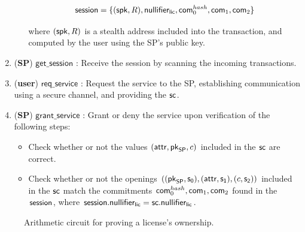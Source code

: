 \begin{enumerate}
\begin{itemize}
			$$\mathsf{session} = \{(\mathsf{spk}, R), \mathsf{nullifier_{lic}}, \mathsf{com}_0^{hash}, \mathsf{com}_1, \mathsf{com}_2\}$$

		where $(\mathsf{spk}, R)$ is a stealth address included into the transaction, and computed by the user using the SP's public key.


	\end{itemize}

	\item (\textbf{SP}) $\mathsf{get\_session}$ : Receive the session by scanning the incoming transactions.

	\item (\textbf{user}) $\mathsf{req\_service}$ : Request the service to the SP, establishing communication using a secure channel, and providing the $\mathsf{sc}$.

	\item (\textbf{SP}) $\mathsf{grant\_service}$ : Grant or deny the service upon verification of the following steps:

	\begin{itemize}
		\item Check whether or not the values $(\mathsf{attr}, \mathsf{pk}_{\mathsf{SP}}, c)$ included in the $\mathsf{sc}$ are correct.
		\item Check whether or not the openings $((\mathsf{pk}_{\mathsf{SP}}, \mathsf{s_0}), (\mathsf{attr}, \mathsf{s_1}), (c, \mathsf{s_2}))$ included in the $\mathsf{sc}$ match the commitments $\mathsf{com}_0^{hash}, \mathsf{com}_1, \mathsf{com}_2$ found in the $\mathsf{session}$, where $\mathsf{session}.\mathsf{nullifier_{lic}} = \mathsf{sc}.\mathsf{nullifier_{lic}}$.
	\end{itemize}

\end{enumerate}

\begin{figure}[h]
	\centering
	\setlength{\fboxsep}{5pt}%
	\setlength{\fboxrule}{0.3pt}%
	\caption{Arithmetic circuit for proving a license's ownership.}
	\label{fig:circuit_prove_nft}
\end{figure}

